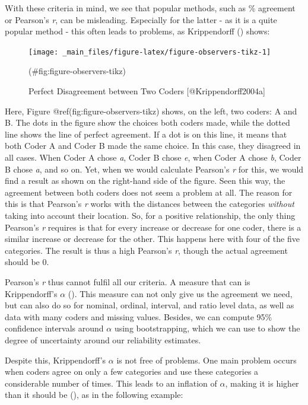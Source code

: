 \documentclass[
]{book}
\begin{document}
With these criteria in mind, we see that popular methods, such as \% agreement or Pearson's \emph{r}, can be misleading. Especially for the latter - as it is a quite popular method - this often leads to problems, as Krippendorff () shows:

\hfill\break

\begin{figure}
\texttt{[image: \_main\_files/figure-latex/figure-observers-tikz-1]} \caption{Perfect Disagreement between Two Coders [@Krippendorff2004a]}(\#fig:figure-observers-tikz)
\end{figure}

\hfill\break

Here, Figure @ref(fig:figure-observers-tikz) shows, on the left, two coders: A and B. The dots in the figure show the choices both coders made, while the dotted line shows the line of perfect agreement. If a dot is on this line, it means that both Coder A and Coder B made the same choice. In this case, they disagreed in all cases. When Coder A chose \emph{a}, Coder B chose \emph{e}, when Coder A chose \emph{b}, Coder B chose \emph{a}, and so on. Yet, when we would calculate Pearson's \emph{r} for this, we would find a result as shown on the right-hand side of the figure. Seen this way, the agreement between both coders does not seem a problem at all. The reason for this is that Pearson's \emph{r} works with the distances between the categories \emph{without} taking into account their location. So, for a positive relationship, the only thing Pearson's \emph{r} requires is that for every increase or decrease for one coder, there is a similar increase or decrease for the other. This happens here with four of the five categories. The result is thus a high Pearson's \emph{r}, though the actual agreement should be 0.

Pearson's \emph{r} thus cannot fulfil all our criteria. A measure that can is Krippendorff's \(\alpha\) (). This measure can not only give us the agreement we need, but can also do so for nominal, ordinal, interval, and ratio level data, as well as data with many coders and missing values. Besides, we can compute 95\% confidence intervals around \(\alpha\) using bootstrapping, which we can use to show the degree of uncertainty around our reliability estimates.

Despite this, Krippendorff's \(\alpha\) is not free of problems. One main problem occurs when coders agree on only a few categories and use these categories a considerable number of times. This leads to an inflation of \(\alpha\), making it is higher than it should be (), as in the following example:
\end{document}
